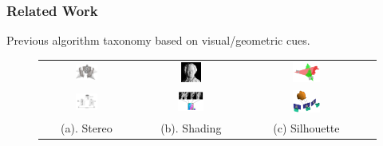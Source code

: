 \documentclass{beamer}
\begin{document}
\begin{frame}
\frametitle{Related Work}
Previous algorithm taxonomy based on visual/geometric cues.

\begin{figure}
\begin{tabular}{cccc}
\includegraphics[width=0.25\textwidth]{images/mvs.png} &
\includegraphics[width=0.2\textwidth]{images/sfs.png} & 
\includegraphics[width=0.25\textwidth]{images/vh.jpg}\\
\includegraphics[width=0.25\textwidth]{images/sl.jpg} & 
\includegraphics[width=0.25\textwidth]{images/ps.png} &
\includegraphics[width=0.25\textwidth]{images/vh_1.png}\\
(a). Stereo & (b). Shading & (c) Silhouette \\
\end{tabular}
\end{figure}
\end{frame}
\end{document}
